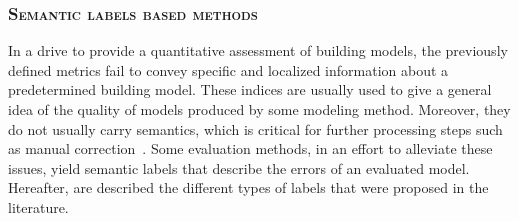         \subsubsection{\textsc{Semantic labels based methods}}
            \label{subsec::state_of_the_art::quality::output::semantic}
            In a drive to provide a quantitative assessment of building models, the previously defined metrics fail to convey specific and localized information about a predetermined building model.
            These indices are usually used to give a general idea of the quality of models produced by some modeling method.
            Moreover, they do not usually carry semantics, which is critical for further processing steps such as manual correction~\parencite{elberink2011quality}.
            Some evaluation methods, in an effort to alleviate these issues, yield semantic labels that describe the errors of an evaluated model.
            Hereafter, are described the different types of labels that were proposed in the literature.\\

